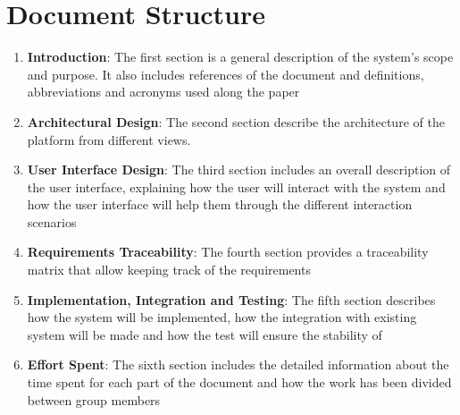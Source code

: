 \section{Document Structure}
\begin{enumerate}
  \item \textbf{Introduction}: The first section is a general description of the system's scope and purpose.
    It also includes references of the document and definitions, abbreviations and acronyms used along the paper
  \item \textbf{Architectural Design}: The second section describe the architecture of the platform from different views.
  \item \textbf{User Interface Design}: The third section includes an overall description of the user interface, explaining how the user will interact with the system and how the user interface will
    help them through the different interaction scenarios
  \item \textbf{Requirements Traceability}: The fourth section provides a traceability matrix that allow keeping track of the requirements
  \item \textbf{Implementation, Integration and Testing}: The fifth section describes how the system will be implemented, how the integration with existing system will be made and how the test will ensure the stability of 
  \item \textbf{Effort Spent}: The sixth section includes the detailed information about the time spent for each part of the document and how the work has been divided between group members
\end{enumerate}